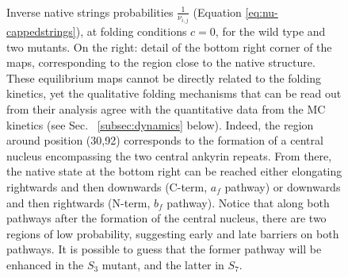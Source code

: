 \begin{figure}
\\
\caption{\label{fig:land} Inverse native strings probabilities $\frac1{\nu_{i,j}}$
(Equation {\protect \ref{eq:nu-cappedstrings}}), at folding conditions $c=0$, for the
wild type and two mutants. On the right: detail of the bottom right corner of
the maps, corresponding to the region close to the native structure.
These equilibrium maps  cannot be directly related to the folding kinetics, yet
the qualitative folding mechanisms that can be read out from their analysis
agree with the quantitative data from the MC kinetics (see Sec.~{\protect
\ref{subsec:dynamics}} below). Indeed, the region around position (30,92)
corresponds to the formation of a central nucleus  encompassing the two central
ankyrin repeats. From there, the native state at the bottom right can be reached
either elongating rightwards and then downwards (C-term, $a_f$ pathway) or downwards and
then rightwards (N-term, $b_f$ pathway). Notice that along both pathways
after the formation of the central nucleus, there are two regions of low
probability, suggesting early and late barriers on both pathways. It is
possible to guess
that the former pathway will be enhanced in the $S_3$ mutant, and the latter in
$S_7$.}
\end{figure}


